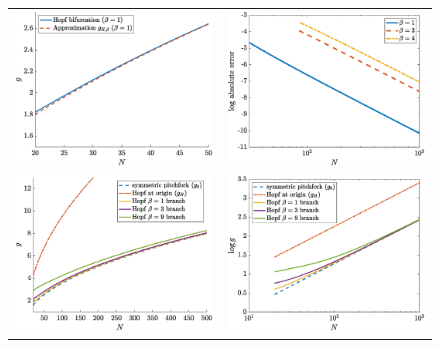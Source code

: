 \documentclass[reqno]{siamonline190516}
\begin{document}
\begin{figure}
    \centering
    \begin{tabular}{cc}
    \includegraphics[width=7.8cm]{images/Hopfapproxbeta1.eps} &
    \includegraphics[width=7.8cm]{images/Hopfapproxerrorsemilog.eps} \\
    \includegraphics[width=7.8cm]{images/HopfNvsg.eps} &
    \includegraphics[width=7.8cm]{images/HopflogNvsgsemilog.eps}

\end{tabular}
\end{figure}
\end{document}
